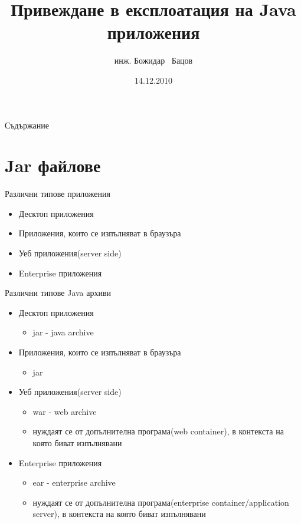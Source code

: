 \documentclass{beamer}
\title{Привеждане в експлоатация на Java приложения}
\author{инж. Божидар ~Бацов}
\institute{Drow Ltd.}
\date{14.12.2010}
\begin{document}
\begin{frame}
  \titlepage
\end{frame}

\begin{frame}{Съдържание}
  \tableofcontents[pausesections]
\end{frame}

\section{Jar файлове}

\begin{frame}{Различни типове приложения}
  \transdissolve
  \begin{itemize}
  \item Десктоп приложения
  \item Приложения, които се изпълняват в браузъра
  \item Уеб приложения(server side)
  \item Enterprise приложения
  \end{itemize}
\end{frame}

\begin{frame}{Различни типове Java архиви}
  \transdissolve
  \begin{itemize}
  \item Десктоп приложения
    \begin{itemize}
      \item jar - java archive
    \end{itemize}
  \item Приложения, които се изпълняват в браузъра
    \begin{itemize}
      \item jar
    \end{itemize}
  \item Уеб приложения(server side)
    \begin{itemize}
      \item war - web archive
      \item нуждаят се от допълнителна програма(web container), в
        контекста на която биват изпълнявани
    \end{itemize}
  \item Enterprise приложения
    \begin{itemize}
      \item ear - enterprise archive
      \item нуждаят се от допълнителна програма(enterprise
        container/application server), в контекста на която биват изпълнявани
    \end{itemize}
  \end{itemize}
\end{frame}
\end{document}
